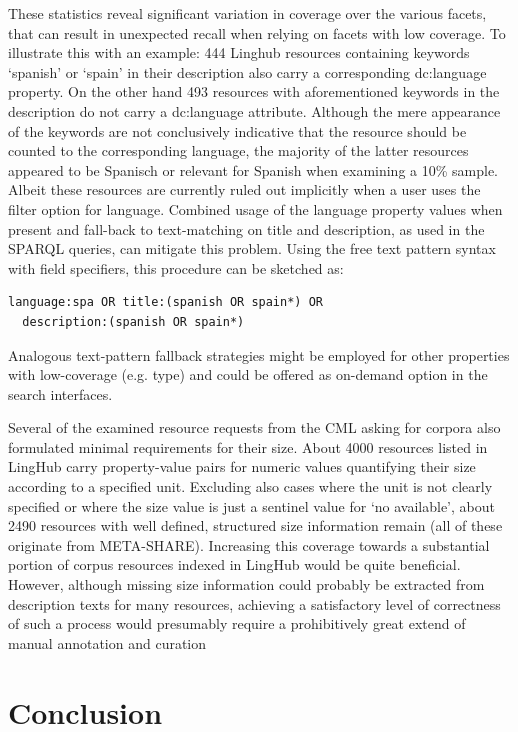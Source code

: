\documentclass[smallextended]{svjour3}       %
\begin{document}
These statistics reveal significant variation in coverage over the various
facets, that can result in unexpected recall when relying on facets with low
coverage. To illustrate this with an example: 444 Linghub resources containing
keywords `spanish' or `spain' in their description also carry a corresponding
dc:language property. On the other hand 493 resources with aforementioned
keywords in the description do not carry a dc:language attribute. Although the
mere appearance of the keywords are not conclusively indicative that the
resource should be counted to the corresponding language, the majority of the
latter resources appeared to be Spanisch or relevant for Spanish when examining
a 10\% sample. Albeit these resources are currently ruled out implicitly when a
user uses the filter option for language. Combined usage of the language
property values when present and fall-back to text-matching on title and
description, as used in the SPARQL queries, can mitigate this problem. Using the
free text pattern syntax with field specifiers, this procedure can be sketched
as: 

\begin{verbatim}
language:spa OR title:(spanish OR spain*) OR 
  description:(spanish OR spain*)
\end{verbatim}

Analogous text-pattern fallback strategies might be employed for other
properties with low-coverage (e.g. type) and could be offered as on-demand
option in the search interfaces. 

Several of the examined resource requests from the CML asking for corpora also
formulated minimal requirements for their size. About 4000 resources listed in
LingHub carry property-value pairs for numeric values quantifying their size
according to a specified unit. Excluding also cases where the unit is not
clearly specified or where the size value is just a sentinel value for ‘no
available’, about 2490 resources with well defined, structured size information
remain (all of these originate from META-SHARE).  Increasing this coverage
towards a substantial portion of corpus resources indexed in LingHub would be
quite beneficial. However, although missing size information could probably be
extracted from description texts for many resources, achieving a satisfactory
level of correctness of such a process would presumably require a prohibitively
great extend of manual annotation and curation


\section{Conclusion}
\label{conclusion}


\end{document}
